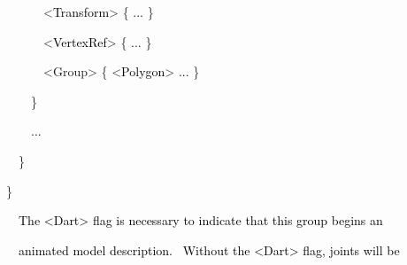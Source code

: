 \documentclass[a4paper]{article}
\newcommand\textstyleOOoComputerKeyWord[1]{\textrm{\textcolor[rgb]{0.0,0.0,0.5019608}{#1}}}
\newcommand\textstyleOOoAssemblerSpecialChar[1]{\textrm{\textcolor[rgb]{0.0,0.5019608,0.0}{#1}}}
\newcommand\textstyleOOoAssemblerIdent[1]{\textrm{\textcolor{black}{#1}}}
\newcommand\textstyleOOoAssemblerDirective[1]{\textrm{\textcolor[rgb]{0.0,0.5019608,1.0}{#1}}}
\begin{document}
{\color{black}
\textstyleOOoComputerKeyWord{\textcolor{black}{\ \ \ \ \ \ }}\textstyleOOoAssemblerSpecialChar{{\textless}}\textstyleOOoAssemblerIdent{Transform}\textstyleOOoAssemblerSpecialChar{{\textgreater}}\textstyleOOoComputerKeyWord{\textcolor{black}{
}}\textstyleOOoAssemblerSpecialChar{\{}\textstyleOOoComputerKeyWord{\textcolor{black}{
}}\textstyleOOoAssemblerIdent{...}\textstyleOOoComputerKeyWord{\textcolor{black}{
}}\textstyleOOoAssemblerSpecialChar{\}}}

{\color{black}
\textstyleOOoComputerKeyWord{\textcolor{black}{\ \ \ \ \ \ }}\textstyleOOoAssemblerSpecialChar{{\textless}}\textstyleOOoAssemblerIdent{VertexRef}\textstyleOOoAssemblerSpecialChar{{\textgreater}}\textstyleOOoComputerKeyWord{\textcolor{black}{
}}\textstyleOOoAssemblerSpecialChar{\{}\textstyleOOoComputerKeyWord{\textcolor{black}{
}}\textstyleOOoAssemblerIdent{...}\textstyleOOoComputerKeyWord{\textcolor{black}{
}}\textstyleOOoAssemblerSpecialChar{\}}}

{\color{black}
\textstyleOOoComputerKeyWord{\textcolor{black}{\ \ \ \ \ \ }}\textstyleOOoAssemblerSpecialChar{{\textless}}\textstyleOOoAssemblerDirective{Group}\textstyleOOoAssemblerSpecialChar{{\textgreater}}\textstyleOOoComputerKeyWord{\textcolor{black}{
}}\textstyleOOoAssemblerSpecialChar{\{}\textstyleOOoComputerKeyWord{\textcolor{black}{
}}\textstyleOOoAssemblerSpecialChar{{\textless}}\textstyleOOoAssemblerIdent{Polygon}\textstyleOOoAssemblerSpecialChar{{\textgreater}}\textstyleOOoComputerKeyWord{\textcolor{black}{
}}\textstyleOOoAssemblerIdent{...}\textstyleOOoComputerKeyWord{\textcolor{black}{
}}\textstyleOOoAssemblerSpecialChar{\}}}

{\color{black}
\textstyleOOoComputerKeyWord{\textcolor{black}{\ \ \ \ }}\textstyleOOoAssemblerSpecialChar{\}}}

{\color{black}
\textstyleOOoComputerKeyWord{\textcolor{black}{\ \ \ \ }}\textstyleOOoAssemblerIdent{...}}

{\color{black}
\textstyleOOoComputerKeyWord{\textcolor{black}{\ \ }}\textstyleOOoAssemblerSpecialChar{\}}}

{\color{black}
\textstyleOOoAssemblerSpecialChar{\}}}


\bigskip

{\color{black}
\textstyleOOoComputerKeyWord{\textcolor{black}{\ \ The {\textless}Dart{\textgreater} flag is necessary to indicate that
this group begins an}}}

{\color{black}
\textstyleOOoComputerKeyWord{\textcolor{black}{\ \ animated model description. \ Without the
{\textless}Dart{\textgreater} flag, joints will be}}}
\end{document}
